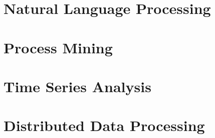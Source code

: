 \documentclass[12pt]{report}
\begin{document}
    \section{Natural Language Processing}
    \section{Process Mining}
    \section{Time Series Analysis}
    \section{Distributed Data Processing}
\end{document}
